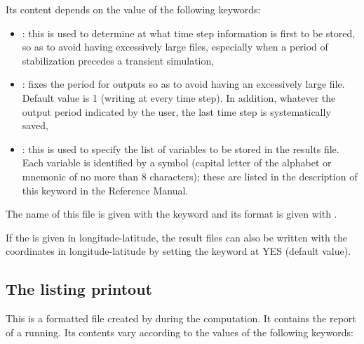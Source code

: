 Its content depends on the value of the following keywords:
\begin{itemize}
\item {}:
this is used to determine at what time step information is first to be stored,
so as to avoid having excessively large files, especially when a period of
stabilization precedes a transient simulation,

\item {}:
fixes the period for outputs so as to avoid having an excessively large file.
Default value is 1 (writing at every time step).
In addition, whatever the output period indicated by the user,
the last time step is systematically saved,

\item {}:
this is used to specify the list of variables to be stored in the results file.
Each variable is identified by a symbol (capital letter of the alphabet
or mnemonic of no more than 8 characters);
these are listed in the description of this keyword in the Reference Manual.


\end{itemize}

The name of this file is given with the keyword 
and its format is given with .

If the  is given in longitude-latitude, the result files
can also be written with the coordinates in longitude-latitude
by setting the keyword 
at YES (default value).

\subsection{The listing printout}

This is a formatted file created by  during the computation.
It contains the report of a  running.
Its contents vary according to the values of the following keywords:

